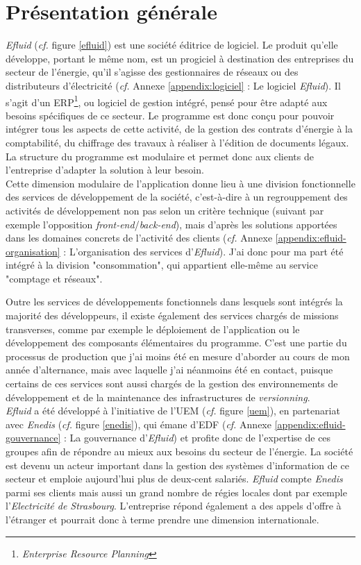 \documentclass[a4paper, 12pt]{report}
\begin{document}
\section{Présentation générale}

\textit{Efluid} (\textit{cf.} figure \ref{efluid}) est une société éditrice de logiciel. Le produit qu'elle développe, portant le même nom, est un progiciel à destination des entreprises du secteur de l'énergie, qu'il s'agisse des gestionnaires de réseaux ou des distributeurs d'électricité (\textit{cf.} Annexe \ref{appendix:logiciel} : Le logiciel \textit{Efluid}). Il s'agit d'un ERP\footnote{\textit{Enterprise Resource Planning}}, ou logiciel de gestion intégré, pensé pour être adapté aux besoins spécifiques de ce secteur. Le programme est donc conçu pour pouvoir intégrer tous les aspects de cette activité, de la gestion des contrats d'énergie à la comptabilité, du chiffrage des travaux à réaliser à l'édition de documents légaux. La structure du programme est modulaire et permet donc aux clients de l'entreprise d'adapter la solution à leur besoin.\\

Cette dimension modulaire de l'application donne lieu à une division fonctionnelle des services de développement de la société, c'est-à-dire à un regrouppement des activités de développement non pas selon un critère technique (suivant par exemple l'opposition \textit{front-end}/\textit{back-end}), mais d'après les solutions apportées dans les domaines concrets de l'activité des clients (\textit{cf.} Annexe \ref{appendix:efluid-organisation} : L'organisation des services d'\textit{Efluid}). J'ai donc pour ma part été intégré à la division "consommation", qui appartient elle-même au service "comptage et réseaux". 

Outre les services de développements fonctionnels dans lesquels sont intégrés la majorité des développeurs, il existe également des services chargés de missions transverses, comme par exemple le déploiement de l'application ou le développement des composants élémentaires du programme. C'est une partie du processus de production que j'ai moins été en mesure d'aborder au cours de mon année d'alternance, mais avec laquelle j'ai néanmoins été en contact, puisque certains de ces services sont aussi chargés de la gestion des environnements de développement et de la maintenance des infrastructures de \textit{versionning}.\\

\textit{Efluid} a été développé à l'initiative de l'UEM (\textit{cf.} figure \ref{uem}), en partenariat avec \textit{Enedis} (\textit{cf.} figure \ref{enedis}), qui émane d'EDF (\textit{cf.} Annexe \ref{appendix:efluid-gouvernance} : La gouvernance d'\textit{Efluid}) et profite donc de l'expertise de ces groupes afin de répondre au mieux aux besoins du secteur de l'énergie. La société est devenu un acteur important dans la gestion des systèmes d'information de ce secteur et emploie aujourd'hui plus de deux-cent salariés. \textit{Efluid} compte \textit{Enedis} parmi ses clients mais aussi un grand nombre de régies locales dont par exemple l'\textit{Electricité de Strasbourg}. L'entreprise répond également a des appels d'offre à l'étranger et pourrait donc à terme prendre une dimension internationale.
\end{document}
